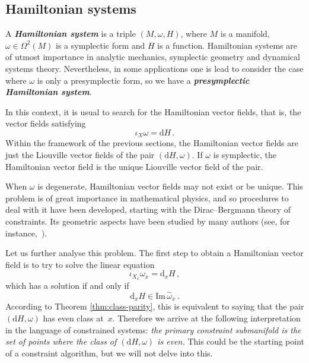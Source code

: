 \documentclass[11pt,twoside]{article}
\theoremstyle{plain}
\theoremstyle{definition}
\renewcommand{\d}{\mathrm{d}}
\newcommand{\Cinfty}{\mathscr{C}^\infty}
\newcommand*{\inn}[1]{\iota_{#1}}
\def\d{\mathrm{d}}
\newcommand\dfn[1]{{\textbf{\emph{#1}}}}
\def\d{\mathrm{d}}
\def\Im{\mathrm{Im \,}}
\begin{document}
\subsection{Hamiltonian systems}

A \dfn{Hamiltonian system} is a triple $(M,\omega,H)$, where $M$ is a manifold, $\omega\in \Omega^2(M)$ is a symplectic form and $H$ is a function.
Hamiltonian systems are of utmost importance in 
analytic mechanics, symplectic geometry and dynamical systems theory.
Nevertheless, in some applications one is lead to consider the case where
$\omega$ is only a presymplectic form,
so we have a \dfn{presymplectic Hamiltonian system}. 


In this context, it is usual to search for the Hamiltonian vector fields, that is, the vector fields satisfying
$$
\inn{X}\omega = \d H\,.
$$
Within the framework of the previous sections, 
the Hamiltonian vector fields are just 
the Liouville vector fields of the pair $(\d H,\omega)$. 
If $\omega$ is symplectic, the Hamiltonian vector field is the unique Liouville vector field of the pair. 

When $\omega$ is degenerate, Hamiltonian vector fields 
may not exist or be unique.
This problem is of great importance in mathematical physics,
and so procedures to deal with it have been developed,
starting with the Dirac--Bergmann theory of constraints.
Its geometric aspects have been studied by many authors 
(see, for instance,~\cite{Car_1990,GNH_1978}).

Let us further analyse this problem.
The first step to obtain a Hamiltonian vector field 
is to try to solve the linear equation
$$
\inn{X_x} \omega_x = \d_x H
\,,
$$
which has a solution if and only if
$$ 
\d_x H \in \Im \widehat\omega_x\,.
$$
According to Theorem \ref{thm:class-parity}, 
this is equivalent to saying that 
the pair $(\d H, \omega)$ has even class at~$x$.
Therefore we arrive at the following interpretation
in the language of constrained systems:
\emph{the primary constraint submanifold
is the set of points where the class of $(\d H, \omega)$ is even.}
This could be the starting point of a constraint algorithm,
but we will not delve into this.
\end{document}
